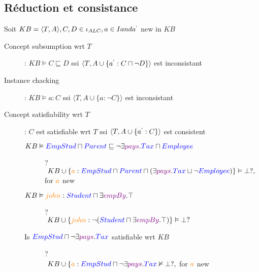 \subsection{Réduction et consistance}
Soit $KB = \langle T,A \rangle , C, D \in \iota_{ALC}, a \in I and a^` $ new in $KB$\\
\begin{description}
\item[Concept subsumption wrt $T$]: $KB \vDash C \sqsubseteq D$ ssi $\langle T, A \cup \{ a^` : C \sqcap \neg D \} \rangle$ est inconsistant
\item[Instance chacking]: $KB \vDash a : C$ ssi $\langle T, A \cup \{ a : \neg C \} \rangle$ est inconsistant
\item[Concept satisfiability wrt $T$]: $C$ est satisfiable wrt $T$ ssi $\langle T,A \cup \{ a^` : C \} \rangle$ est consistent

\begin{description}
\item[$KB \vDash \textcolor{blue}{EmpStud} \sqcap \textcolor{blue}{Parent} \sqsubseteq \neg \exists \textcolor{violet}{pays}.\textcolor{blue}{Tax} \sqcap \textcolor{blue}{Employee} $]?\\ $\ KB \cup \{ \textcolor{orange}{a} : \textcolor{blue}{EmpStud} \sqcap \textcolor{blue}{Parent} \sqcap (\exists \textcolor{violet}{pays}.\textcolor{blue}{Tax} \sqcup \neg \textcolor{blue}{Employee} ) \} \vDash \bot ?,$ for $\textcolor{orange}{a}$ new
\item[$KB \vDash \textcolor{orange}{john} : \textcolor{blue}{Student} \sqcap \exists \textcolor{violet}{empBy}.\top $]?\\  $\ KB \cup \{ \textcolor{orange}{john} : \neg (\textcolor{blue}{Student} \sqcap \exists \textcolor{violet}{empBy}.\top)\} \vDash \bot ?$
\item[Is $\textcolor{blue}{EmpStud} \sqcap \neg \exists \textcolor{violet}{pays}.\textcolor{blue}{Tax}$ satisfiable wrt $KB$ ]?\\ $\ KB \cup \{ \textcolor{orange}{a} : \textcolor{blue}{EmpStud} \sqcap \neg \exists \textcolor{violet}{pays}.\textcolor{blue}{Tax} \nvDash \bot ?,$ for $\textcolor{orange}{a}$ new
\end{description}

\end{description}

\pagebreak